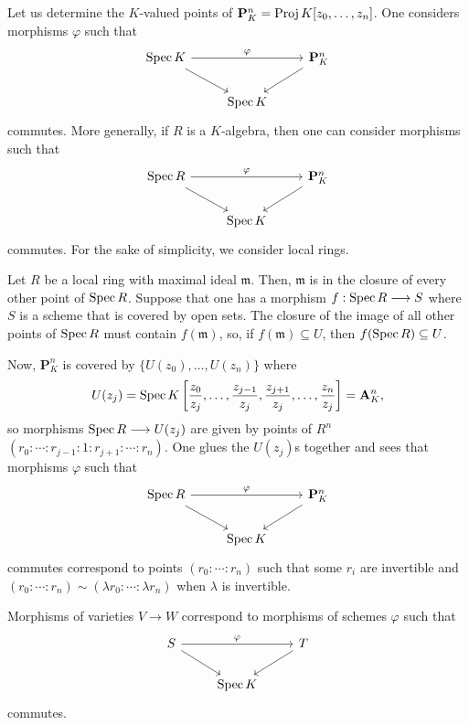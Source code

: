 \documentclass [11 pt, oneside] {article}
\begin{document}
\begin{example}[ ]\label{}\text{}
Let us determine the $K$-valued points of $\mathbf{P}^n_K = \operatorname{Proj} K[ z_0,\hdots, z_n]$. One considers morphisms $\varphi$ such that
\[
\begin{tikzcd}
	\Spec K \ar[rr,"\varphi"] \ar[dr] &&\mathbf{P}^n_K \ar[dl] \\
					  &\Spec K
\end{tikzcd}
\]
commutes. More generally, if $R$ is a $K$-algebra, then one can consider morphisms such that
\[
\begin{tikzcd}
\Spec R\ar[rr,"\varphi"] \ar[dr] &&\mathbf{P}^n_K \ar[dl] \\
                                          &\Spec K	
\end{tikzcd}
\]
commutes. For the sake of simplicity, we consider local rings.

Let $R$ be a local ring with maximal ideal $\mathfrak{m}$. Then, $\mathfrak{m}$ is in the closure of every other point of $\operatorname{Spec} R$. Suppose that one has a morphism $f:\operatorname{Spec} R\longrightarrow S$ where $S$ is a scheme that is covered by open sets. The closure of the image of all other points of $\operatorname{Spec} R$ must contain $f(\mathfrak{m})$, so, if $f(\mathfrak{m}) \subseteq U$, then $f(\operatorname{Spec} R)\subseteq U$.

Now, $\mathbf{P}^n_K$ is covered by $\{U({z_0}), \hdots, U(z_n)\}$ where 
\begin{align*}
	U(z_j)= \operatorname{Spec} K \left[ \frac{z_0}{z_j},\hdots, \frac{z_{j-1}}{z_j}, \frac{z_{j+1}}{z_j},\hdots, \frac{z_n}{z_j} \right] = \mathbf{A}^n_K, 
\end{align*}
so morphisms $\operatorname{Spec} R\longrightarrow U(z_j)$ are given by points of $R^n$ $(r_0:\cdots:r_{j-1}:1:r_{j+1}:\cdots:r_n)$. One glues the $U(z_j)$s together and sees that morphisms $\varphi$ such that 
\[
\begin{tikzcd}
	\Spec R\ar[dr]\ar[rr,"\varphi"] &&\mathbf{P}^n_K\ar[dl]\\
				       &\Spec K
\end{tikzcd}
\]
commutes correspond to points $(r_0:\cdots:r_n)$ such that some $r_i$ are invertible and $(r_0:\cdots:r_n) \sim (\lambda r_0:\cdots:\lambda r_n)$ when $\lambda$ is invertible.
\end{example}

\begin{remark}
	Morphisms of varieties $V\longrightarrow W$ correspond to morphisms of schemes $\varphi$ such that
	\[
	\begin{tikzcd}
		S\ar[rr,"\varphi"] \ar[dr] && T\ar[ld] \\
					   &\Spec K
	\end{tikzcd}
	\]
	commutes.	
\end{remark}
\end{document}
